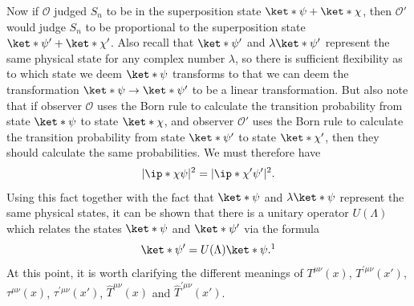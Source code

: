 \documentclass[12pt]{report}
\begin{document}
Now if  $\mathcal{O}$ judged $S_n$ to be in the superposition state $\ket*{\psi}+\ket*{\chi}$, then $\mathcal{O}'$ would judge $S_n$ to be proportional to the superposition state $\ket*{\psi'}+\ket*{\chi'}$. Also recall that $\ket*{\psi'}$ and $\lambda\ket*{\psi'}$ represent the same physical state for any complex number $\lambda$, so there is sufficient flexibility as to which state we deem $\ket*{\psi}$ transforms to that we can deem the transformation $\ket*{\psi}\rightarrow\ket*{\psi'}$ to be a linear transformation. But also note that if observer $\mathcal{O}$ uses the Born rule to calculate the transition probability from state $\ket*{\psi}$ to state $\ket*{\chi}$, and  observer $\mathcal{O}'$ uses the Born rule to calculate the transition probability from state $\ket*{\psi'}$ to state $\ket*{\chi'}$, then they should calculate the same probabilities. We must therefore have
$$|\ip*{\chi}{\psi}|^2=|\ip*{\chi'}{\psi'}|^2.$$
Using this fact together with the fact that $\ket*{\psi}$ and $\lambda\ket*{\psi}$ represent the same physical states, it can be shown that there is a unitary operator $U(\Lambda)$ %
%
 which relates the states $\ket*{\psi}$ and $\ket*{\psi'}$ via the formula
$$\ket*{\psi'}=U(\Lambda)\ket*{\psi}.\protect\footnotemark$$At this point, it is worth clarifying the different meanings of $T^{\mu\nu}(x)$, $T^{\prime\mu\nu}(x')$, $\tau^{\mu\nu}(x)$, $\tau^{\prime\mu\nu}(x')$,  $\hat{T}^{\mu\nu}(x)$ and $\hat{T}^{\prime\mu\nu}(x')$. 
\end{document}

